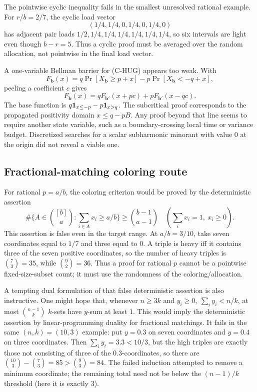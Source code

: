 \documentclass[12pt]{article}
\begin{document}
The pointwise cyclic inequality fails in the smallest unresolved rational
example.  For \(r/b=2/7\), the cyclic load vector
\[
 (1/4,1/4,0,1/4,0,1/4,0)
\]
has adjacent pair loads \(1/2,1/4,1/4,1/4,1/4,1/4,1/4\), so six intervals are
light even though \(b-r=5\).  Thus a cyclic proof must be averaged over the
random allocation, not pointwise in the final load vector.

A one-variable Bellman barrier for (C-HUG) appears too weak.  With
\[
F_{\mathbf b}(x)=q\Pr[X_{\mathbf b}\ge p+x]
        -p\Pr[X_{\mathbf b}<-q+x],
\]
peeling a coefficient \(c\) gives
\[
F_{\mathbf b}(x)=qF_{\mathbf b'}(x+pc)+pF_{\mathbf b'}(x-qc).
\]
The base function is \(q{\bf1}_{x\le-p}-p{\bf1}_{x>q}\).  The subcritical proof
corresponds to the propagated positivity domain \(x\le q-pB\).  Any proof beyond
that line seems to require another state variable, such as a boundary-crossing
local time or variance budget.  Discretized searches for a scalar subharmonic
minorant with value \(0\) at the origin did not reveal a viable one.



\subsection*{Fractional-matching coloring route}

For rational \(p=a/b\), the coloring criterion would be proved by the
deterministic assertion
\[
\#\{A\in {[b]\choose a}:\sum_{i\in A}x_i\ge a/b\}\ge {b-1\choose a-1}
\quad(\sum_i x_i=1,\ x_i\ge0).
\]
This assertion is false even in the target range.  At \(a/b=3/10\), take seven
coordinates equal to \(1/7\) and three equal to \(0\).  A triple is heavy iff it
contains three of the seven positive coordinates, so the number of heavy triples
is \({7\choose3}=35\), while \({9\choose2}=36\).  Thus a proof for rational
\(p\) cannot be a pointwise fixed-size-subset count; it must use the randomness
of the coloring/allocation.

A tempting dual formulation of that false deterministic assertion is also
instructive.  One might hope that, whenever \(n\ge3k\) and
\(y_i\ge0,\ \sum_i y_i<n/k\), at most \({n-1\choose k}\) \(k\)-sets have
\(y\)-sum at least \(1\).  This would imply the deterministic assertion by
linear-programming duality for fractional matchings.  It fails in the same
\((n,k)=(10,3)\) example: put \(y=0.3\) on seven coordinates and \(y=0.4\) on
three coordinates.  Then \(\sum_i y_i=3.3<10/3\), but the high triples are
exactly those not consisting of three of the \(0.3\)-coordinates, so there are
\({10\choose3}-{7\choose3}=85>{9\choose3}=84\).  The failed induction attempted
to remove a minimum coordinate; the remaining total need not be below the
\((n-1)/k\) threshold (here it is exactly \(3\)).
\end{document}
